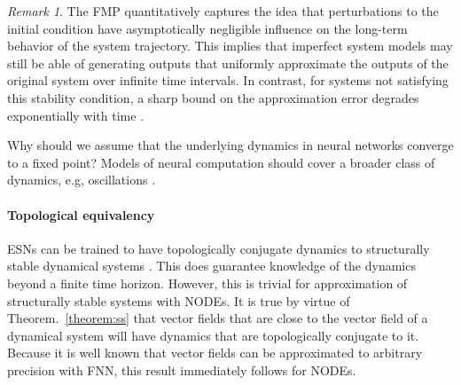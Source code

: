 \documentclass{article}
\theoremstyle{definition}
\theoremstyle{remark}
\newtheorem{remark}{Remark}
\newcounter{ct}
\begin{document}
 
\begin{remark}
The FMP quantitatively captures the idea that perturbations to the initial condition have asymptotically negligible influence on the long-term behavior of the system trajectory.
This implies that imperfect system models may still be able of generating outputs that uniformly approximate the outputs of the original system over infinite time intervals.
In contrast, for systems not satisfying this stability condition, a sharp bound on the approximation error degrades exponentially with time \citep{hirsch1974nonautonomous, sontag2013mathematical}.
\end{remark}



Why should we assume that the underlying dynamics in neural networks converge to a fixed point?
Models of neural computation should cover a broader class of dynamics, e.g, oscillations \citep{townley2000existence, kag2020rnns, chang2019antisymmetricrnn}. %







\paragraph{Topological equivalency}
ESNs can be trained to have  topologically conjugate dynamics to structurally stable dynamical systems \citep{hart2020embedding}.
This does guarantee knowledge of the dynamics beyond a finite time horizon.
However, this is trivial for approximation of structurally stable systems with NODEs.
It is true by virtue of Theorem.~\ref{theorem:ss} that vector fields that are close to the vector field of a dynamical system will have dynamics that are topologically conjugate to it.
Because it is well known that vector fields can be approximated to arbitrary precision with FNN, this result immediately follows for NODEs.

\end{document}

